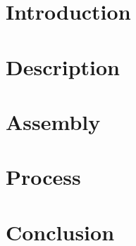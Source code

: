 \documentclass[]{article}
\begin{document}

\tableofcontents
\listoffigures
\newpage

\section{Introduction}	
	
\newpage
\section{Description}
	
\newpage
\section{Assembly}
	
\newpage
\section{Process}

\section{Conclusion}
\end{document}
